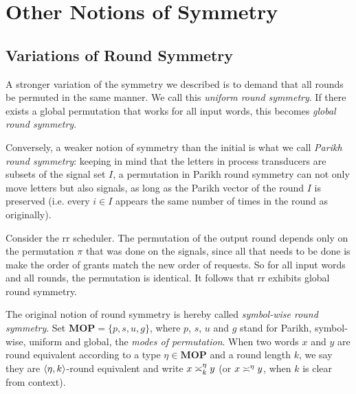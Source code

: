 \chapter{Other Notions of Symmetry}
\label{chap:other_notions}

\section{Variations of Round Symmetry}
\newcommand{\RSTYPES}{\ensuremath{\mathbf{MOP}}}
\newcommand{\RSTUPS}{\ensuremath{\mathbf{MOP}^2_k}}

A stronger variation of the symmetry we described is to demand that all rounds be permuted in the same manner. We call this \emph{uniform round symmetry}. If there exists a global permutation that works for all input words, this becomes \emph{global round symmetry}.

Conversely, a weaker notion of symmetry than the initial is what we call \emph{Parikh round symmetry}: keeping in mind that the letters in process transducers are subsets of the signal set $I$, a permutation in Parikh round symmetry can not only move letters but also signals, as long as the Parikh vector of the round \WRT $I$ is preserved (i.e. every $i\in I$ appears the same number of times in the round as originally).

\begin{example}
Consider the \gls{rr} scheduler. The permutation of the output round depends only on the permutation $\pi$ that was done on the signals, since all that needs to be done is make the order of grants match the new order of requests. So for all input words and all rounds, the permutation is identical. It follows that \gls{rr} exhibits global round symmetry.
\end{example}

The original notion of round symmetry is hereby called \emph{symbol-wise round symmetry}.
Set $\RSTYPES=\{p, s, u, g\}$, where $p$, $s$, $u$ and $g$ stand for Parikh, symbol-wise, uniform and global, the \emph{modes of permutation}. When two words $x$ and $y$ are round equivalent according to a type $\eta \in \RSTYPES$ and a round length $k$, we say they are $\tup{\eta,k}$-round equivalent and write $x\req[k]^\eta y$ (or $x\req[]^\eta y$, when $k$ is clear from context).

